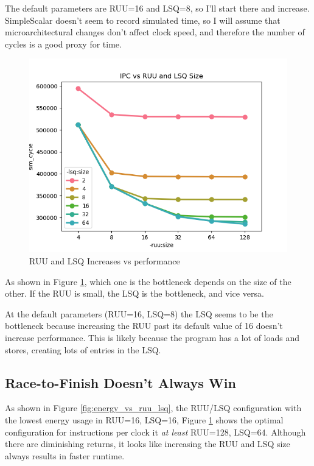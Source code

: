 \documentclass{article}
\begin{document}
\begin{multicols}{2}
  The default parameters are RUU=16 and LSQ=8, so I'll start there and increase. SimpleScalar doesn't seem to record simulated time, so I will assume that microarchitectural changes don't affect clock speed, and therefore the number of cycles is a good proxy for time.

  \begin{figure}[H]
    \centering
    \includegraphics[width=\linewidth]{./assets/ruu_and_lsq_vs_sim_time.png}
    \caption{RUU and LSQ Increases vs performance}
    \label{fig:ruu_or_lsq_bottleneck}
  \end{figure}

  As shown in Figure \ref{fig:ruu_or_lsq_bottleneck}, which one is the bottleneck depends on the size of the other. If the RUU is small, the LSQ is the bottleneck, and vice versa.

  At the default parameters (RUU=16, LSQ=8) the LSQ seems to be the bottleneck because increasing the RUU past its default value of 16 doesn't increase performance. This is likely because the program has a lot of loads and stores, creating lots of entries in the LSQ.

  \subsection{Race-to-Finish Doesn't Always Win}
  As shown in Figure \ref{fig:energy_vs_ruu_lsq}, the RUU/LSQ configuration with the lowest energy usage in RUU=16, LSQ=16, Figure \ref{fig:ruu_or_lsq_bottleneck} shows the optimal configuration for instructions per clock it \textit{at least} RUU=128, LSQ=64. Although there are diminishing returns, it looks like increasing the RUU and LSQ size always results in faster runtime.


\end{multicols}
\end{document}
